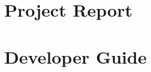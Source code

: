\documentclass[a4paper,oneside]{alpenthesis/alpenthesis}
\begin{document}
\part{Project Report}
\label{part:project_report}










%
%
\part{Developer Guide}
\label{part:Developer_Guide}

%
%
\end{document}
